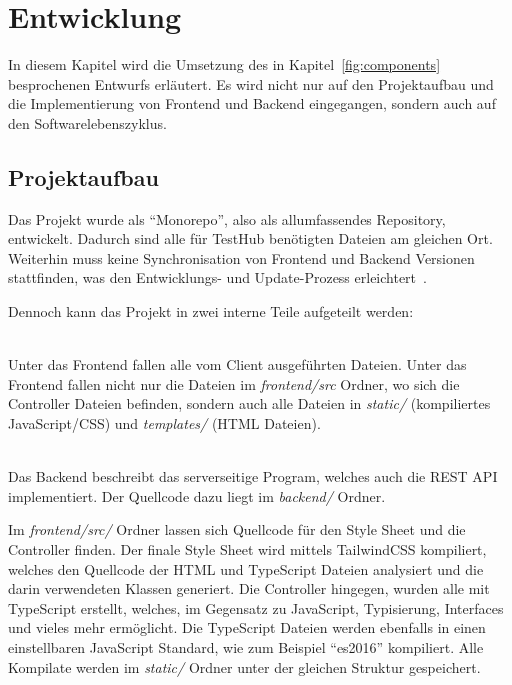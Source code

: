 \section{Entwicklung}
In diesem Kapitel wird die Umsetzung des in Kapitel~\ref{fig:components} besprochenen
Entwurfs erläutert. Es wird nicht nur auf den Projektaufbau und die Implementierung 
von \gls{Frontend} und \gls{Backend} eingegangen, sondern auch auf den Softwarelebenszyklus.

\subsection{Projektaufbau}
Das Projekt wurde als ``Monorepo'', also als allumfassendes Repository, entwickelt.
Dadurch sind alle für TestHub benötigten Dateien am gleichen Ort. Weiterhin muss 
keine Synchronisation von Frontend und Backend Versionen stattfinden, was den
Entwicklungs- und Update-Prozess erleichtert~\cite{PL16}.

Dennoch kann das Projekt in zwei interne Teile aufgeteilt werden:

\begin{description}
    \hfill\\
    Unter das Frontend fallen alle vom Client ausgeführten Dateien. Unter das Frontend
    fallen nicht nur die Dateien im \textit{frontend/src} Ordner, wo sich die 
    Controller Dateien befinden, sondern auch alle Dateien in \textit{static/} (kompiliertes JavaScript/CSS) 
    und \textit{templates/} (HTML Dateien).

    \hfill\\
    Das Backend beschreibt das serverseitige Program, welches auch die \gls{REST} \gls{API}
    implementiert. Der Quellcode dazu liegt im \textit{backend/} Ordner.
\end{description}

Im \textit{frontend/src/} Ordner lassen sich Quellcode für den Style Sheet und 
die Controller finden. Der finale Style Sheet wird mittels TailwindCSS
kompiliert, welches den Quellcode der HTML und TypeScript Dateien analysiert und
die darin verwendeten Klassen generiert. Die Controller hingegen, wurden alle mit 
TypeScript erstellt, welches, im Gegensatz zu 
JavaScript, Typisierung, Interfaces und vieles mehr ermöglicht. Die TypeScript Dateien 
werden ebenfalls in einen einstellbaren JavaScript Standard, wie zum Beispiel ``es2016''
kompiliert. Alle Kompilate werden im \textit{static/} Ordner unter der gleichen 
Struktur gespeichert.

